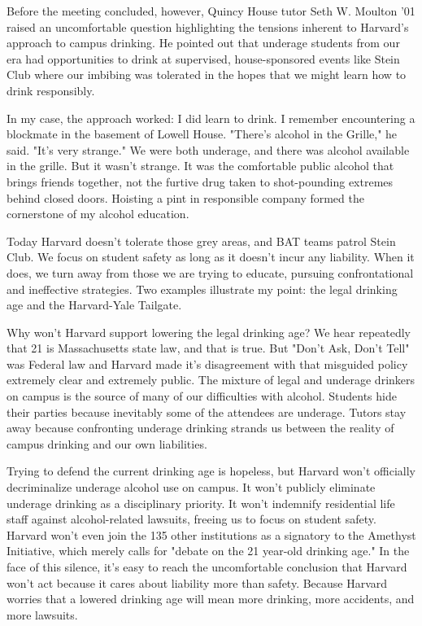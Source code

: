 Before the meeting concluded, however, Quincy House tutor Seth W. Moulton '01
raised an uncomfortable question highlighting the tensions inherent to
Harvard's approach to campus drinking. He pointed out that underage students
from our era had opportunities to drink at supervised, house-sponsored events
like Stein Club where our imbibing was tolerated in the hopes that we might
learn how to drink responsibly.

In my case, the approach worked: I did learn to drink. I remember
encountering a blockmate in the basement of Lowell House. "There's alcohol in
the Grille," he said. "It's very strange." We were both underage, and there
was alcohol available in the grille. But it wasn't strange. It was the
comfortable public alcohol that brings friends together, not the furtive drug
taken to shot-pounding extremes behind closed doors. Hoisting a pint in
responsible company formed the cornerstone of my alcohol education.

Today Harvard doesn't tolerate those grey areas, and BAT teams patrol Stein
Club. We focus on student safety as long as it doesn't incur any liability.
When it does, we turn away from those we are trying to educate, pursuing
confrontational and ineffective strategies. Two examples illustrate my point:
the legal drinking age and the Harvard-Yale Tailgate.
 
Why won't Harvard support lowering the legal drinking age? We hear repeatedly
that 21 is Massachusetts state law, and that is true. But "Don't Ask, Don't
Tell" was Federal law and Harvard made it's disagreement with that misguided
policy extremely clear and extremely public. The mixture of legal and
underage drinkers on campus is the source of many of our difficulties with
alcohol. Students hide their parties because inevitably some of the attendees
are underage. Tutors stay away because confronting underage drinking strands
us between the reality of campus drinking and our own liabilities.

Trying to defend the current drinking age is hopeless, but Harvard won't
officially decriminalize underage alcohol use on campus. It won't publicly
eliminate underage drinking as a disciplinary priority. It won't indemnify
residential life staff against alcohol-related lawsuits, freeing us to focus
on student safety. Harvard won't even join the 135 other institutions as a
signatory to the Amethyst Initiative, which merely calls for "debate on the
21 year-old drinking age." In the face of this silence, it's easy to reach
the uncomfortable conclusion that Harvard won't act because it cares about
liability more than safety. Because Harvard worries that a lowered drinking
age will mean more drinking, more accidents, and more lawsuits.

